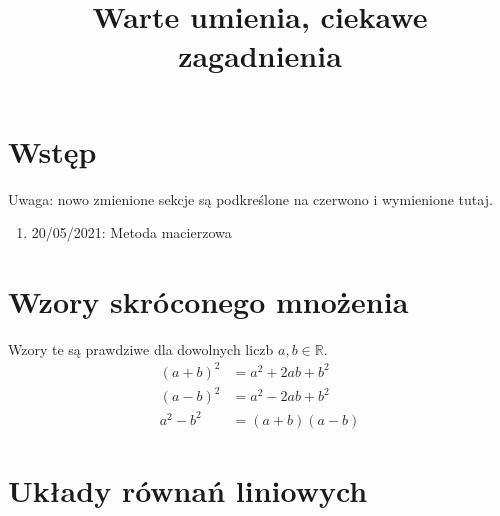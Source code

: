 \documentclass{article}
\title{Warte umienia, ciekawe zagadnienia}
\author{}
\date{}
\theoremstyle{remark}
\begin{document}
\maketitle

\tableofcontents

\section{Wstęp}
Uwaga: nowo zmienione sekcje są podkreślone na czerwono i wymienione tutaj.
\begin{enumerate}
  \item 20/05/2021: Metoda macierzowa
\end{enumerate}
\section{Wzory skróconego mnożenia}
Wzory te są prawdziwe dla dowolnych liczb $a, b\in \mathbb R$.
\begin{align}
  (a+b)^2&=a^2+2ab+b^2\\
  (a-b)^2&=a^2-2ab+b^2\\
  a^2-b^2&=(a+b)(a-b)
\end{align}
\section{Układy równań liniowych}
\end{document}
